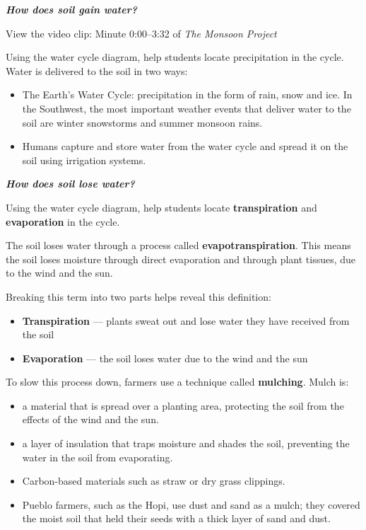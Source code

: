 \documentclass[12pt,]{article}
\providecommand{\tightlist}{%
  \setlength{\itemsep}{0pt}\setlength{\parskip}{0pt}}
\begin{document}
\textbf{\emph{How does soil gain water? }}

View the video clip: Minute 0:00--3:32 of \emph{The Monsoon Project}

Using the water cycle diagram, help students locate precipitation in the cycle. Water is delivered to the soil in two ways:

\begin{itemize}
\tightlist
\item
  The Earth's Water Cycle: precipitation in the form of rain, snow and ice. In the Southwest, the most important weather events that deliver water to the soil are winter snowstorms and summer monsoon rains.
\item
  Humans capture and store water from the water cycle and spread it on the soil using irrigation systems.
\end{itemize}

\textbf{\emph{How does soil lose water? }}

Using the water cycle diagram, help students locate \textbf{transpiration} and \textbf{evaporation} in the cycle.

The soil loses water through a process called \textbf{evapotranspiration}. This means the soil loses moisture through direct evaporation and through plant tissues, due to the wind and the sun.

Breaking this term into two parts helps reveal this definition:

\begin{itemize}
\tightlist
\item
  \textbf{Transpiration} --- plants sweat out and lose water they have received from the soil
\item
  \textbf{Evaporation} --- the soil loses water due to the wind and the sun
\end{itemize}

To slow this process down, farmers use a technique called \textbf{mulching}. Mulch is:

\begin{itemize}
\tightlist
\item
  a material that is spread over a planting area, protecting the soil from the effects of the wind and the sun.
\item
  a layer of insulation that traps moisture and shades the soil, preventing the water in the soil from evaporating.
\item
  Carbon-based materials such as straw or dry grass clippings.
\item
  Pueblo farmers, such as the Hopi, use dust and sand as a mulch; they covered the moist soil that held their seeds with a thick layer of sand and dust.
\end{itemize}
\end{document}

